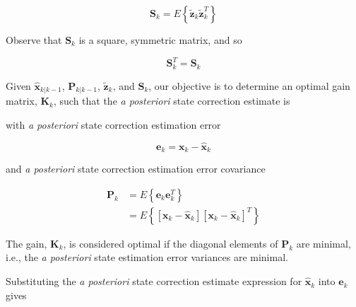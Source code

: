 \begin{equation}
    \mathbf{S}_k = E \left\{ \tilde{\mathbf{z}}_k \tilde{\mathbf{z}}_k^T \right\}
    \label{eq:observation-residual-covariance-Ezzt}
\end{equation}

Observe that $\mathbf{S}_k$ is a square, symmetric matrix, and so

\begin{equation*}
    \mathbf{S}_k^T = \mathbf{S}_k
\end{equation*}

Given $\hat{\mathbf{x}}_{k|k-1}$, $\mathbf{P}_{k|k-1}$, $\tilde{\mathbf{z}}_k$, and
$\mathbf{S}_k$, our objective is to determine an optimal gain matrix, $\mathbf{K}_k$,
such that the \textit{a posteriori} state correction estimate is


with \textit{a posteriori} state correction estimation error

\begin{equation*}
    \mathbf{e}_{k} = \mathbf{x}_{k} - \hat{\mathbf{x}}_{k}
\end{equation*}

and \textit{a posteriori} state correction estimation error covariance

\begin{equation*}
    \begin{aligned}
        \mathbf{P}_{k} &= E \left\{ \mathbf{e}_{k} \mathbf{e}_{k}^T \right\} \\
        &= E \left\{ \left[ \mathbf{x}_{k} - \hat{\mathbf{x}}_{k} \right] \left[ \mathbf{x}_{k} - \hat{\mathbf{x}}_{k} \right]^T \right\}
    \end{aligned}
\end{equation*}

The gain, $\mathbf{K}_k$, is considered optimal if the diagonal elements of $\mathbf{P}_k$
are minimal, i.e., the \textit{a posteriori} state estimation error variances are minimal.

Substituting the \textit{a posteriori} state correction estimate expression for
$\hat{\mathbf{x}}_k$ into $\mathbf{e}_k$ gives

